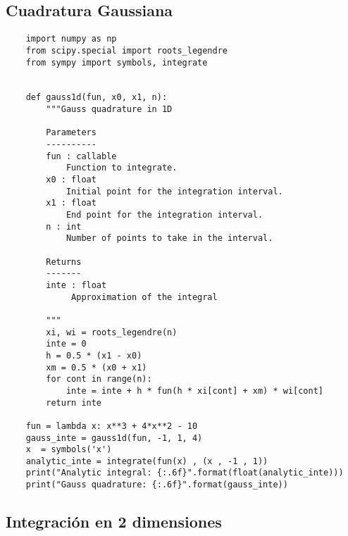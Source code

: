 \subsection{Cuadratura Gaussiana}

\begin{verbatim}
    import numpy as np
    from scipy.special import roots_legendre
    from sympy import symbols, integrate
    
    
    def gauss1d(fun, x0, x1, n):
        """Gauss quadrature in 1D
        
        Parameters
        ----------
        fun : callable
            Function to integrate.
        x0 : float
            Initial point for the integration interval.
        x1 : float
            End point for the integration interval.
        n : int
            Number of points to take in the interval.
        
        Returns
        -------
        inte : float
             Approximation of the integral
        
        """
        xi, wi = roots_legendre(n)
        inte = 0
        h = 0.5 * (x1 - x0)
        xm = 0.5 * (x0 + x1)
        for cont in range(n):
            inte = inte + h * fun(h * xi[cont] + xm) * wi[cont]
        return inte

    fun = lambda x: x**3 + 4*x**2 - 10
    gauss_inte = gauss1d(fun, -1, 1, 4)
    x  = symbols('x')
    analytic_inte = integrate(fun(x) , (x , -1 , 1))
    print("Analytic integral: {:.6f}".format(float(analytic_inte)))
    print("Gauss quadrature: {:.6f}".format(gauss_inte))
\end{verbatim}


\subsection{Integración en 2 dimensiones}


